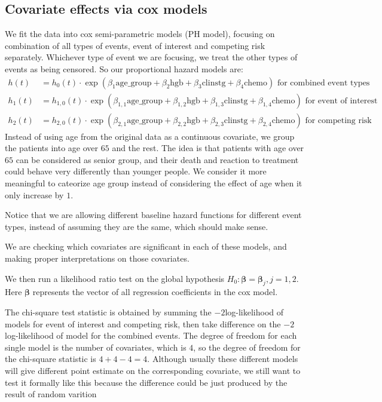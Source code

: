 \documentclass[times, doublespace]{simauth}
\begin{document}
\subsection{Covariate effects via cox models}
We fit the data into cox semi-parametric models (PH model), focusing on combination of all types of events, event of interest and competing risk separately. Whichever type of event we are focusing, we treat the other types of events as being censored. So our proportional hazard models are:
\begin{align*}
	h(t) &= h_0(t)\cdot \exp(\beta_1\text{age}\_\text{group} + \beta_2\text{hgb} + \beta_3\text{clinstg} + \beta_4\text{chemo}) \text{ for combined event types}\\
	h_1(t) &= h_{1, 0}(t)\cdot \exp(\beta_{1, 1}\text{age}\_\text{group} + \beta_{1, 2}\text{hgb} + \beta_{1, 3}\text{clinstg} + \beta_{1,4}\text{chemo}) \text{ for event of interest}\\
	h_2(t) &= h_{2,  0}(t)\cdot \exp(\beta_{2, 1}\text{age}\_\text{group} + \beta_{2, 2}\text{hgb} + \beta_{2, 3}\text{clinstg} + \beta_{2,4}\text{chemo}) \text{ for competing risk}
\end{align*}
Instead of using age from the original data as a continuous covariate, we group the patients into age over $65$ and the rest. The idea is that patients with age over $65$ can be considered as senior group, and their death and reaction to treatment could behave very differently than younger people. We consider it more meaningful to cateorize age group instead of considering the effect of age when it only increase by $1$.

Notice that we are allowing different baseline hazard functions for different event types, instead of assuming they are the same, which should make sense.

We are checking which covariates are significant in each of these models, and making proper interpretations on those covariates.

We then run a likelihood ratio test on the global hypothesis $H_0: {\bm \beta} = {\bm \beta}_j, j = 1, 2$. Here ${\bm \beta}$ represents the vector of all regression coefficients in the cox model.

The chi-square test statistic is obtained by summing the $-2$log-likelihood of models for event of interest and competing risk, then take difference on the $-2$log-likelihood of model for the combined events. The degree of freedom for each single model is the number of covariates, which is $4$, so the degree of freedom for the chi-square statistic is $4 + 4 - 4 = 4$. Although usually these different models will give different point estimate on the corresponding covariate, we still want to test it formally like this because the difference could be just produced by the result of random varition\cite{Allison10}
\end{document}
